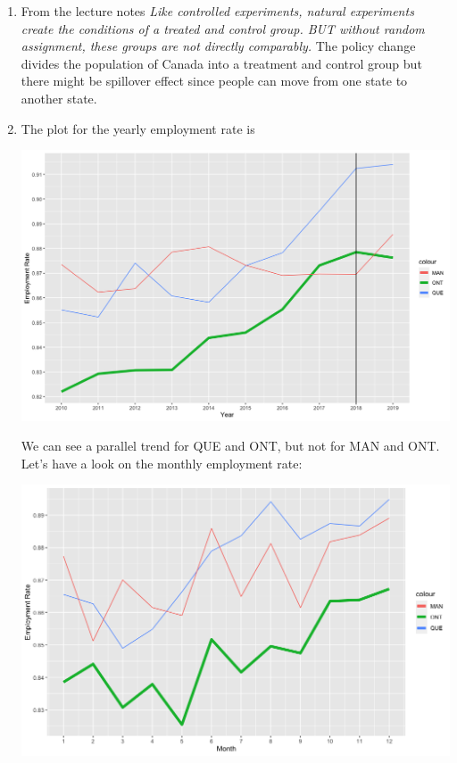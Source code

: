 \documentclass{article}
\begin{document}
	\begin{enumerate}[label=(\alph*)]
		\item From the lecture notes \textit{Like controlled experiments, natural experiments create the conditions of a treated and control group. BUT without random assignment, these groups are not directly comparably.} The policy change divides the population of Canada into a treatment and control group but there might be spillover effect since people can move from one state to another state.
		\item The plot for the yearly employment rate is
		\begin{center}
			\includegraphics[scale=0.29]{employment_yearly}
		\end{center}
		We can see a parallel trend for QUE and ONT, but not for MAN and ONT. Let's have a look on the monthly employment rate:
		\begin{center}
			\includegraphics[scale=0.3]{employment_monthly}
		\end{center}

\end{enumerate}
\end{document}
